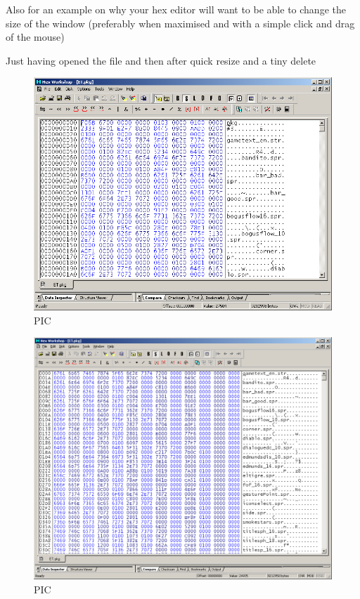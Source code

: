 \documentclass[
]{book}
\begin{document}
Also for an example on why your hex editor will want to be able to change the size of the window (preferably when maximised and with a simple click and drag of the mouse)

Just having opened the file and then after quick resize and a tiny delete

\begin{figure}
\centering
\includegraphics{images/18_home_fast6191_romhackingguide_unrenamed_file___borders_romhackingguidebasicfileformatshex1.png}
\caption{PIC}
\end{figure}

\begin{figure}
\centering
\includegraphics{images/19_home_fast6191_romhackingguide_unrenamed_file___borders_romhackingguidebasicfileformatshex2.png}
\caption{PIC}
\end{figure}
\end{document}
